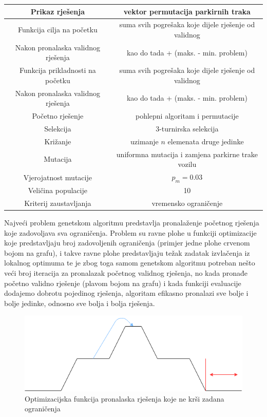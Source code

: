 \documentclass[11pt]{article}
\begin{document}
\begin{center}
\centering

  \begin{tabular}{ | >{\columncolor[gray]{0.6}}c |c|}
    \hline
 Prikaz rješenja & vektor permutacija parkirnih traka \\ \hline
Funkcija cilja na početku & suma svih pogrešaka koje dijele rješenje od validnog \\
Nakon pronalaska validnog rješenja & kao do tada + (maks. - min. problem) \\ \hline
Funkcija prikladnosti na početku & suma svih pogrešaka koje dijele rješenje od validnog\\
Nakon pronalaska validnog rješenja & kao do tada + (maks. - min. problem) \\ \hline
Početno rješenje & pohlepni algoritam i permutacije \\ \hline
Selekcija & 3-turnirska selekcija\\ \hline
Križanje & uzimanje $n$ elemenata druge jedinke\\ \hline
Mutacija & uniformna mutacija i zamjena parkirne trake vozilu\\ \hline
Vjerojatnost mutacije & $p_m=0.03$ \\ \hline
Veličina populacije & 10\\ \hline
Kriterij zaustavljanja & vremensko ograničenje \\ \hline
\end{tabular}
 \label{tab:title} 
\end{center}
\newpage

Najveći problem genetskom algoritmu predstavlja pronalaženje početnog rješenja koje zadovoljava sva ograničenja. Problem su ravne plohe u funkciji optimizacije koje predstavljaju broj zadovoljenih ograničenja (primjer jedne plohe crvenom bojom na grafu), i takve ravne plohe predstavljaju težak zadatak izvlačenja iz lokalnog optimuma te je zbog toga samom genetskom algoritmu potreban nešto veći broj iteracija za pronalazak početnog validnog rješenja, no kada pronađe početno validno rješenje (plavom bojom na grafu) i kada funkciji evaluacije dodajemo dobrotu pojedinog rješenja, algoritam efikasno pronalazi sve bolje i bolje jedinke, odnosno sve bolja i bolja rješenja.
\begin{center}
\begin{figure}
  \includegraphics[width=\linewidth]{fjaOptimizacije.png}
  \caption{Optimizacijska funkcija pronalaska rješenja koje ne krši zadana ograničenja }
  \label{fig:optFun}
\end{figure}

\end{center}
\end{document}
